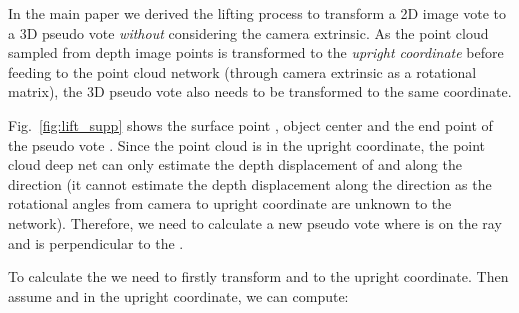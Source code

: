 \documentclass[10pt,twocolumn,letterpaper]{article}
\begin{document}
In the main paper we derived the lifting process to transform a 2D image vote to a 3D pseudo vote \emph{without} considering the camera extrinsic. As the point cloud sampled from depth image points is transformed to the \emph{upright coordinate} before feeding to the point cloud network (through camera extrinsic  as a rotational matrix), the 3D pseudo vote also needs to be transformed to the same coordinate.

Fig.~\ref{fig:lift_supp} shows the surface point , object center  and the end point of the pseudo vote . Since the point cloud is in the upright coordinate, the point cloud deep net can only estimate the depth displacement of  and  along the  direction (it cannot estimate the depth displacement along the  direction as the rotational angles from camera to upright coordinate are unknown to the network). Therefore, we need to calculate a new pseudo vote  where  is on the ray  and  is perpendicular to the .

To calculate the  we need to firstly transform  and  to the upright coordinate. Then assume  and  in the upright coordinate, we can compute:
\end{document}
